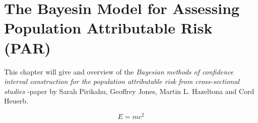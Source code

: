 \chapter{The Bayesin Model for Assessing Population Attributable Risk (PAR)} \label{bayesian-model}

This chapter will give and overview of the \textit{Bayesian methods of confidence interval construction for the population attributable risk from cross-sectional studies} -paper by Sarah Pirikahu, Geoffrey Jones, Martin L. Hazeltona and Cord Heuerb. 

\begin{equation}
E = mc^2
\end{equation}
